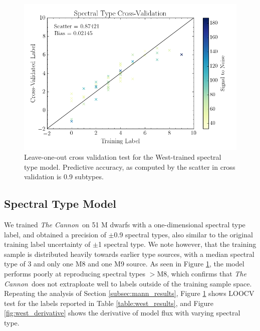 \documentclass[twocolumn]{aastex62}
\newcommand{\thecannon}{\textsl{The Cannon}}
\begin{document}
\begin{figure}
	\begin{center}
	\includegraphics[width=\linewidth]{figures/crv_test_spt.png}
	\end{center}
	\caption{Leave-one-out cross validation test for the West-trained spectral type model. Predictive accuracy, as computed by the scatter in cross validation is 0.9 subtypes.}
	\label{fig:west_validation}
\end{figure}

\subsection{Spectral Type Model \label{subsec:west_results}}

We trained \thecannon\ on 51 M dwarfs with a one-dimensional spectral type label, and obtained a precision of $\pm$0.9 spectral types, also similar to the original training label uncertainty of $\pm$1 spectral type. We note however, that the training sample is distributed heavily towards earlier type sources, with a median spectral type of 3 and only one M8 and one M9 source. As seen in Figure \ref{fig:west_validation}, the model performs poorly at reproducing spectral types $>$M8, which confirms that \thecannon\ does not extraploate well to labels outside of the training sample space. Repeating the analysis of Section \ref{subsec:mann_results}, Figure \ref{fig:west_validation} shows LOOCV test for the labels reported in Table \ref{table:west_results}, and Figure \ref{fig:west_derivative} shows the derivative of model flux with varying spectral type.

\end{document}
